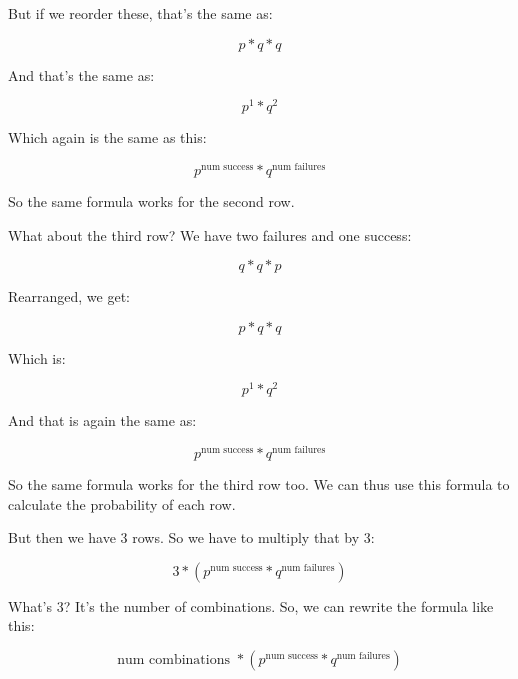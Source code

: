 \documentclass[../../../main.tex]{subfiles}
\begin{document}
But if we reorder these, that's the same as:

\begin{equation*}
   p * q * q
\end{equation*}

And that's the same as:

\begin{equation*}
   p^{1} * q^{2}
\end{equation*}

Which again is the same as this:

\begin{equation*}
   p^{\text{num success}} * q^{\text{num failures}}
\end{equation*}

So the same formula works for the second row.

What about the third row? We have two failures and one success:

\begin{equation*}
    q * q * p
\end{equation*}

Rearranged, we get:

\begin{equation*}
    p * q * q
\end{equation*}

Which is:

\begin{equation*}
   p^{1} * q^{2}
\end{equation*}

And that is again the same as:

\begin{equation*}
   p^{\text{num success}} * q^{\text{num failures}}
\end{equation*}

So the same formula works for the third row too. We can thus use this formula to calculate the probability of each row. 

But then we have 3 rows. So we have to multiply that by 3:

\begin{equation*}
    3 * (p^{\text{num success}} * q^{\text{num failures}})
\end{equation*}

What's 3? It's the number of combinations. So, we can rewrite the formula like this:

\begin{equation*}
    \text{num combinations } * (p^{\text{num success}} * q^{\text{num failures}})
\end{equation*}
\end{document}
